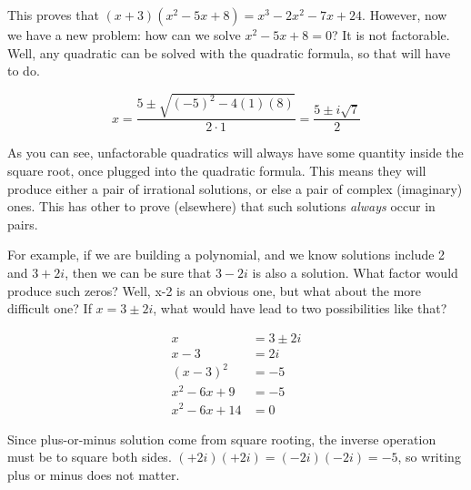 
This proves that $(x+3)(x^2-5x+8)=x^3-2x^2-7x+24$.  However, now we have a new problem: how
can we solve $x^2-5x+8=0$?  It is not factorable.  Well, any quadratic can be solved with
the quadratic formula, so that will have to do.

$$
x=\frac{5\pm\sqrt{(-5)^2-4(1)(8)}}{2\cdot{}1}
=\frac{5\pm i\sqrt{7}}{2}
$$

As you can see, unfactorable quadratics will always have some quantity inside the square root,
once plugged into the quadratic formula.  This means they will produce either a pair of
irrational solutions, or else a pair of complex (imaginary) ones.  This has other to prove
(elsewhere) that such solutions \emph{always} occur in pairs.

For example, if we are building a polynomial, and we know solutions include 2 and $3+2i$,
then we can be sure that $3-2i$ is also a solution.  What factor would produce such zeros?
Well, x-2 is an obvious one, but what about the more difficult one?  If $x=3 \pm 2i$, what
would have lead to two possibilities like that?

\begin{align*}
  x & = 3 \pm 2i\\
  x - 3 & =  2i \\
  (x-3)^2 & = -5\\
  x^2-6x+9 &= -5\\
  x^2-6x+14 &= 0
\end{align*}

Since plus-or-minus solution come from square rooting, the inverse operation must be to
square both sides.  $(+2i)(+2i) = (-2i)(-2i) = -5$, so writing plus or minus does not matter.

